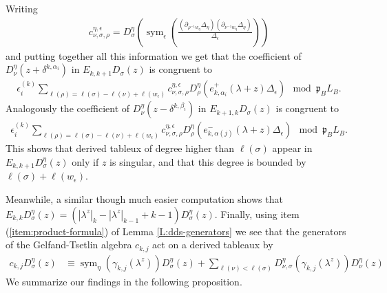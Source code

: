 \documentclass[11pt,fleqn]{article}
\newcommand\p{\mathfrak p}
\DeclareMathOperator\sym{sym}
\begin{document}
Writing
\begin{align*}
c_{\nu,\sigma,\rho}^{\eta,\epsilon} 
= D_{\sigma}^\eta \left(
    \sym_\epsilon\left( 
      \frac{
        (\partial_{\rho^{-1}w_\eta}\Delta_\eta)
        (\partial_{\nu^{-1}w_\eta}\Delta_\eta)
      }{\Delta_\epsilon} \right) 
    \right) 
\end{align*}
and putting together all this information we get that the coefficient of 
$D_{\nu}^\eta(z+\delta^{k,\alpha_i})$ in $E_{k,k+1} D_\sigma(z)$ is congruent
to
\begin{align*}
\epsilon^{(k)}_i 
    \sum_{\ell(\rho) = \ell(\sigma) - \ell(\nu) + \ell(w_\epsilon)} 
          c_{\nu,\sigma,\rho}^{\eta,\epsilon} D^\eta_\rho \left(
      e_{k,\alpha_i}^+(\lambda + z) \Delta_\epsilon
    \right) \mod \p_B L_B.
\end{align*}
Analogously the coefficient of $D_{\nu}^\eta(z-\delta^{k,\beta_i})$ in 
$E_{k+1,k} D_\sigma(z)$ is congruent to
\begin{align*}
\epsilon^{(k)}_i 
  \sum_{\ell(\rho) = \ell(\sigma) - \ell(\nu) + \ell(w_\epsilon)} 
          c_{\nu,\sigma,\rho}^{\eta,\epsilon} D^\eta_\rho \left(
      e_{k,\alpha(j)}^-(\lambda + z) \Delta_\epsilon
    \right) \mod \p_B L_B.
\end{align*}
This shows that derived tableux of degree higher than $\ell(\sigma)$ appear
in $E_{k,k+1} D^\eta_\sigma(z)$ only if $z$ is singular, and that this degree
is bounded by $\ell(\sigma) + \ell(w_\epsilon)$.

Meanwhile, a similar though much easier computation shows that $E_{k,k} 
D_\sigma^\eta(z) = (|\lambda^z|_k - |\lambda^z|_{k-1} + k -1) 
D_\sigma^\eta(z)$. Finally, using item (\ref{item:product-formula}) of Lemma
\ref{L:dds-generators} we see that the generators of the Gelfand-Tsetlin 
algebra $c_{k,j}$ act on a derived tableaux by
\begin{align*}
c_{k,j} D_\sigma^\eta (z) 
  &\equiv \sym_\eta (\gamma_{k,j}(\lambda^z)) D_\sigma^\eta(z)
   + \sum_{\ell(\nu) < \ell(\sigma)} 
      D_{\nu, \sigma}^\eta(\gamma_{k,j}(\lambda^z)) D_\nu^\eta(z)
\end{align*}
We summarize our findings in the following proposition.
\end{document}
